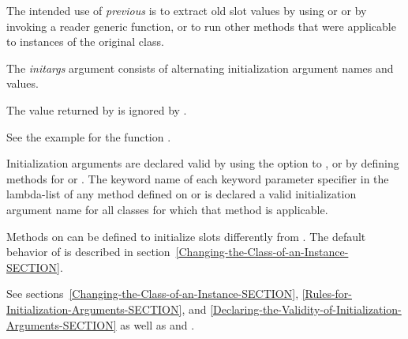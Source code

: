 \begin{defun}
The intended use of {\it previous\/} is to extract old slot values by using
 or  or by invoking a reader generic
function, or to run other methods that were applicable to instances of
the original class.

The {\it initargs\/} argument consists of alternating initialization
argument names and values.


The value returned by  is
ignored by .

See the example for the function .


Initialization arguments are declared valid by using the 
 option to , or by defining methods for 
 or .  The
keyword name of each keyword parameter specifier in the lambda-list of
any method defined on  or 
 is declared a valid initialization argument name
for all classes for which that method is applicable.

Methods on  can be defined to
initialize slots differently from .  The default
behavior of  is described in
section~\ref{Changing-the-Class-of-an-Instance-SECTION}.


See sections~\ref{Changing-the-Class-of-an-Instance-SECTION},
\ref{Rules-for-Initialization-Arguments-SECTION}, and
\ref{Declaring-the-Validity-of-Initialization-Arguments-SECTION} as well as
 and .
\end{defun}


